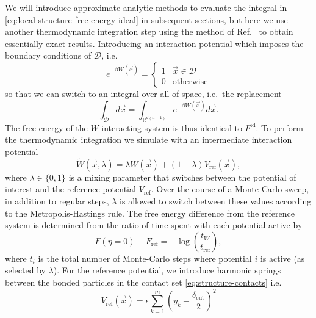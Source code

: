 \documentclass[11pt,twoside]{report}
\begin{document}
We will introduce approximate analytic methods to evaluate the integral in \eqref{eq:local-structure-free-energy-ideal} in subsequent sections, but here we use another thermodynamic integration step using the method of Ref.\ \cite{SchillingJCP2009} to obtain essentially exact results.
Introducing an interaction potential which imposes the boundary conditions of $\mathcal{D}$, i.e.\
\begin{equation*}
  e^{-\beta W(\vec{x})}
  =
  \begin{cases}
    1 & \vec{x} \in \mathcal{D} \\
    0 & \textrm{otherwise}
  \end{cases}
\end{equation*}
so that we can switch to an integral over all of space, i.e.\ the replacement
\begin{equation*}
  \int_{\mathcal{D}} d\vec{x}
  =
  \int_{\mathbb{R}^{d(n-1)}} e^{-\beta W(\vec{x})} d\vec{x}.
\end{equation*}
The free energy of the $W$-interacting system is thus identical to $F^\mathrm{id}$.
To perform the thermodynamic integration we simulate with an intermediate interaction potential \cite{SchillingJCP2009}
\begin{equation*}
  \widetilde{W}(\vec{x}, \lambda)
  =
  \lambda W(\vec{x}) + (1-\lambda) V_\mathrm{ref}(\vec{x}),
\end{equation*}
where $\lambda \in \{0,1\}$ is a mixing parameter that switches between the potential of interest and the reference potential $V_\mathrm{ref}$.
Over the course of a Monte-Carlo sweep, in addition to regular steps, $\lambda$ is allowed to switch between these values according to the Metropolis-Hastings rule.
The free energy difference from the reference system is determined from the ratio of time spent with each potential active by
\begin{equation}\label{eq:ideal-free-energy-change}
  F(\eta = 0) - F_\mathrm{ref}
  = -\log{\left( \frac{t_W}{t_\mathrm{ref}} \right)},
\end{equation}
where $t_i$ is the total number of Monte-Carlo steps where potential $i$ is active (as selected by $\lambda$).
For the reference potential, we introduce harmonic springs between the bonded particles in the contact set \eqref{eq:structure-contacts} i.e.\
\begin{equation*}
  V_\mathrm{ref}(\vec{x})
  =
  \epsilon \sum_{k=1}^m \left( y_k - \frac{\delta_\mathrm{cut}}{2} \right)^2
\end{equation*}
\end{document}
